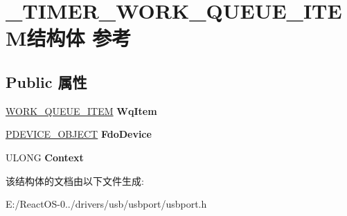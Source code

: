 \hypertarget{struct___t_i_m_e_r___w_o_r_k___q_u_e_u_e___i_t_e_m}{}\section{\+\_\+\+T\+I\+M\+E\+R\+\_\+\+W\+O\+R\+K\+\_\+\+Q\+U\+E\+U\+E\+\_\+\+I\+T\+E\+M结构体 参考}
\label{struct___t_i_m_e_r___w_o_r_k___q_u_e_u_e___i_t_e_m}
\subsection*{Public 属性}
\begin{DoxyCompactItemize}
\item 
\mbox{\label{struct___t_i_m_e_r___w_o_r_k___q_u_e_u_e___i_t_e_m_a5f1fbc6b3e48b91157153daed1ece22c}} 
\hyperlink{struct___w_o_r_k___q_u_e_u_e___i_t_e_m}{W\+O\+R\+K\+\_\+\+Q\+U\+E\+U\+E\+\_\+\+I\+T\+EM} {\bfseries Wq\+Item}
\item 
\mbox{\label{struct___t_i_m_e_r___w_o_r_k___q_u_e_u_e___i_t_e_m_adf73038b14cb5ce8a529a6dbdeee01c6}} 
\hyperlink{struct___d_e_v_i_c_e___o_b_j_e_c_t}{P\+D\+E\+V\+I\+C\+E\+\_\+\+O\+B\+J\+E\+CT} {\bfseries Fdo\+Device}
\item 
\mbox{\label{struct___t_i_m_e_r___w_o_r_k___q_u_e_u_e___i_t_e_m_ac8147db691356de65b9b8f7d2587cd8f}} 
U\+L\+O\+NG {\bfseries Context}
\end{DoxyCompactItemize}


该结构体的文档由以下文件生成\+:\begin{DoxyCompactItemize}
\item 
E\+:/\+React\+O\+S-\/0../drivers/usb/usbport/usbport.\+h\end{DoxyCompactItemize}
